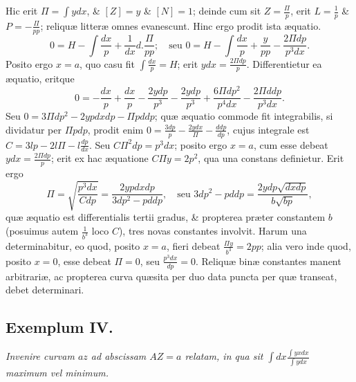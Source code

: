 Hic erit $\Pi=\int ydx$, \& $[Z]=y$ \& $[N]=1$; deinde cum sit $Z=\frac{\Pi}{p}$, erit $L=\frac1p$ \& $P=-\frac{\Pi}{pp}$; reliquæ litteræ omnes evanescunt. Hinc ergo prodit ista æquatio.
\[0=H-\int\frac{dx}p+\frac1{dx}d.\frac{\Pi}{pp};\quad\text{seu }0=H-\int\frac{dx}p+\frac y{pp}-\frac{2\Pi dp}{p^3dx}.\]
Posito ergo $x=a$, quo casu fit $\int\frac{dx}p=H$; erit $ydx=\frac{2\Pi dp}p$. Differentietur ea æquatio, eritque
\[0=-\frac{dx}p+\frac{dx}p-\frac{2ydp}{p^3}-\frac{2ydp}{p^3}+\frac{6\Pi dp^2}{p^4dx}-\frac{2\Pi ddp}{p^3dx}.\]
Seu $0=3\Pi dp^2-2ypdxdp-\Pi pddp$; quæ æquatio commode fit integrabilis, si dividatur per $\Pi pdp$, prodit enim $0=\frac{3dp}p-\frac{2ydx}{\Pi}-\frac{ddp}{dp}$, cujus integrale est $C=3lp-2l\Pi-l\frac{dp}{dx}$. Seu $C\Pi^2dp=p^3dx$; posito ergo $x=a$, cum esse debeat $ydx=\frac{2\Pi dp}p$; erit ex hac æquatione $C\Pi y=2p^2$, qua una constans definietur. Erit ergo
\[\Pi=\sqrt{\frac{p^3dx}{Cdp}}=\frac{2ypdxdp}{3dp^2-pddp},\quad\text{seu }3dp^2-pddp=\frac{2ydp\sqrt{dxdp}}{b\sqrt{bp}},\]
quæ æquatio est differentialis tertii gradus, \& propterea præter constantem $b$ (posuimus autem $\frac1{b^3}$ loco $C$), tres novas constantes involvit. Harum una determinabitur, eo quod, posito $x=a$, fieri debeat $\frac{\Pi y}{b^3}=2pp$; alia vero inde quod, posito $x=0$, esse debeat $\Pi=0$, seu $\frac{p^3dx}{dp}=0$. Reliquæ
binæ constantes manent arbitrariæ, ac propterea curva quæsita per duo data puncta per quæ transeat, debet determinari.
\subsection*{Exemplum IV.}
\textit{Invenire curvam $az$ ad abscissam $AZ=a$ relatam, in qua sit $\int dx\frac{\int yxdx}{\int ydx}$ maximum vel minimum.}

